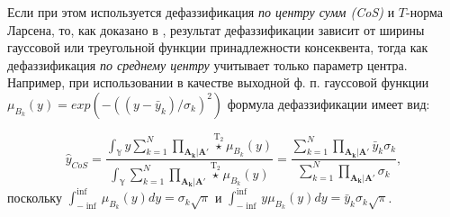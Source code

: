 Если при этом используется дефаззификация \textit{по центру сумм (CoS)} и $T$-норма Ларсена, то, как доказано в \cite{Sinuk2023}, результат дефаззификации зависит от ширины гауссовой или треугольной функции принадлежности консеквента, тогда как дефаззификация \textit{по среднему центру} учитывает только параметр центра. Например, при использовании в качестве выходной ф. п. гауссовой функции $\mu_{B_k}(y) = exp(-((y-\bar{y}_k)/\sigma_k)^2)$ формула дефаззификации имеет вид: 

\begin{equation}
	\hat{y}_{CoS} = \frac{\int_{\mathbb{Y}} y \sum_{k=1}^{N} \prod_{\mathbf{A_k}|\mathbf{A'}} \overset{\mathrm{T}_2}{\star} \mu_{B_k}(y)}{\int_{\mathbb{Y}} \sum_{k=1}^{N} \prod_{\mathbf{A_k}|\mathbf{A'}} \overset{\mathrm{T}_2}{\star} \mu_{B_k}(y)} = \frac{\sum_{k=1}^{N} \prod_{\mathbf{A_k}|\mathbf{A'}} \bar{y}_k \sigma_k}{\sum_{k=1}^{N} \prod_{\mathbf{A_k}|\mathbf{A'}} \sigma_k},
\end{equation}
поскольку $	\int_{-\inf}^{\inf}\mu_{B_k}(y) dy = \sigma_k \sqrt{\pi}$ и $\int_{-\inf}^{\inf} y \mu_{B_k}(y) dy = \bar{y}_k \sigma_k \sqrt{\pi}$.

